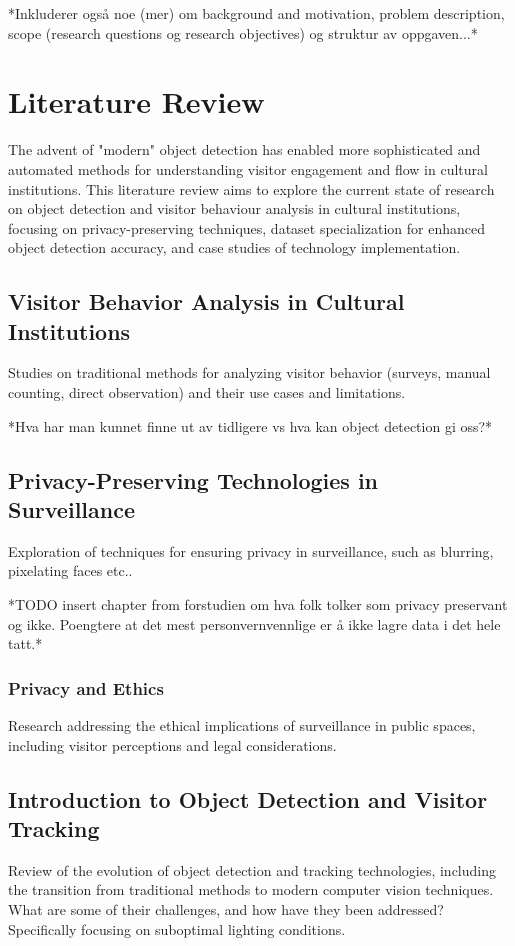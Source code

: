 *Inkluderer også noe (mer) om background and motivation, problem description, scope (research questions og research objectives) og struktur av oppgaven...*

\section{Literature Review}
The advent of "modern" object detection has enabled more sophisticated and automated methods for understanding visitor engagement and flow in cultural institutions. This literature review aims to explore the current state of research on object detection and visitor behaviour analysis in cultural institutions, focusing on privacy-preserving techniques, dataset specialization for enhanced object detection accuracy, and case studies of technology implementation. 

\subsection{Visitor Behavior Analysis in Cultural Institutions}
Studies on traditional methods for analyzing visitor behavior (surveys, manual counting, direct observation) and their use cases and limitations.

*Hva har man kunnet finne ut av tidligere vs hva kan object detection gi oss?*

\subsection{Privacy-Preserving Technologies in Surveillance}
Exploration of techniques for ensuring privacy in surveillance, such as blurring, pixelating faces etc.. 

*TODO insert chapter from forstudien om hva folk tolker som privacy preservant og ikke. Poengtere at det mest personvernvennlige er å ikke lagre data i det hele tatt.*

\subsubsection{Privacy and Ethics}
Research addressing the ethical implications of surveillance in public spaces, including visitor perceptions and legal considerations.

\subsection{Introduction to Object Detection and Visitor Tracking}
Review of the evolution of object detection and tracking technologies, including the transition from traditional methods to modern computer vision techniques. What are some of their challenges, and how have they been addressed? Specifically focusing on suboptimal lighting conditions.

